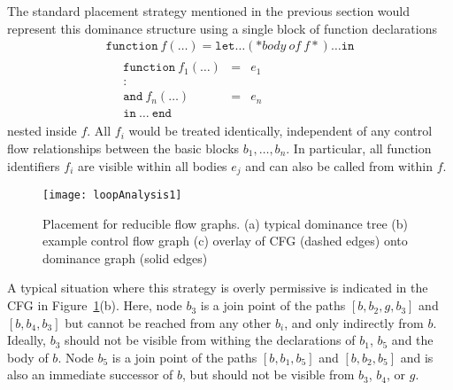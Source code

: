 The standard placement strategy mentioned in the previous section
would represent this dominance structure
using a single block of function declarations
\begin{equation}
\label{sec:SSA:functiondeclarationblock}
\begin{array}{l}
  \mathtt{function}\ f (\ldots)= 
  \mathtt{let} \ldots (* \mathit{body\ of\ f}*)\ldots \mathtt{in}\\
  \quad \begin{array}{rcl}
            \mathtt{function}\ f_1(\ldots) & = & e_1\\
             : \\
            \mathtt{and}\ f_n(\ldots) & = & e_n\\
            \mathtt{in}\ \ldots\ \mathtt{end}
        \end{array}
  \end{array}
\end{equation}
nested inside $f$. All $f_i$ would be treated identically, independent
of any control flow relationships between the basic blocks $b_1,
\ldots, b_n$. In particular, all function identifiers $f_i$ are
visible within all bodies $e_j$ and can also be called from within
$f$.

\begin{figure}
\begin{center}
\texttt{[image: loopAnalysis1]}
\end{center}
\caption{\label{FigLoopAnalysis1ReducibleGraph} Placement for reducible flow graphs. (a) typical dominance tree (b) example control flow graph (c) overlay of CFG (dashed edges) onto dominance graph (solid edges) }
\end{figure}
A typical situation where this strategy is overly permissive is
indicated in the CFG in
Figure~\ref{FigLoopAnalysis1ReducibleGraph}(b). Here, node $b_3$ is a
join point of the paths $[b,b_2,g,b_3]$ and $[b,b_4,b_3]$ but cannot
be reached from any other $b_i$, and only indirectly from $b$.
Ideally, $b_3$ should not be visible from withing the declarations of
$b_1$, $b_5$ and the body of $b$. Node $b_5$ is a join point of the
paths $[b,b_1,b_5]$ and $[b,b_2,b_5]$ and is also an immediate
successor of $b$, but should not be visible from $b_3$, $b_4$, or $g$.

